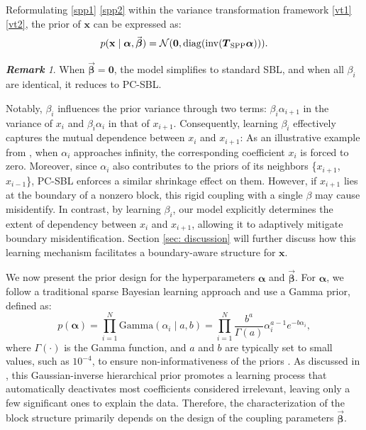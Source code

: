\documentclass[lettersize,journal]{IEEEtran}
\DeclareMathOperator{\inv}{inv}
\DeclareMathOperator{\diag}{diag}
\theoremstyle{remark}
\newtheorem{remark}{\textbf{Remark}}
\begin{document}
Reformulating \eqref{spp1} \eqref{spp2} within the variance transformation framework \eqref{vt1} \eqref{vt2}, the prior of \( \mathbf{x} \) can be expressed as:  
\begin{equation}
	p(\mathbf{x} \mid \boldsymbol{\alpha}, \vec{\boldsymbol{\beta}}) = \mathcal{N}(\mathbf{0},  \diag(\inv(\boldsymbol{T}_{\rm SPP}\boldsymbol{\alpha}))).\label{prior_x}
\end{equation}

\begin{remark}
	When $\vec{\boldsymbol{\beta}} = \mathbf{0}$, the model simplifies to standard SBL, and when all \( \beta_i \) are identical, it reduces to PC-SBL.
\end{remark}

\vspace{2mm}

 Notably, \( \beta_i \) influences the prior variance through two terms: \( \beta_i \alpha_{i+1} \) in the variance of \( x_i \) and \( \beta_i \alpha_i \) in that of \( x_{i+1} \). Consequently, learning \( \beta_i \) effectively captures the mutual dependence between \( x_i \) and \( x_{i+1} \): 
As an illustrative example from \cite{fang2014pattern}, when \( \alpha_i \) approaches infinity, the corresponding coefficient \( x_i \) is forced to zero. Moreover, since \( \alpha_i \) also contributes to the priors of its neighbors \{\( x_{i+1} \), \( x_{i-1} \)\},  PC-SBL enforces a similar shrinkage effect on them. However, if \( x_{i+1} \) lies at the boundary of a nonzero block, this rigid coupling with a single $\beta$ may cause misidentify. In contrast, by learning \( \beta_i \), our model explicitly determines the extent of dependency between \( x_i \) and \( x_{i+1} \), allowing it to adaptively mitigate boundary misidentification. {Section \ref{sec: discussion}} will further discuss how this learning mechanism facilitates a boundary-aware structure for \( \mathbf{x} \).

We now present the prior design for the hyperparameters \( \boldsymbol{\alpha} \) and $\vec{\boldsymbol{\beta}}$. For \( \boldsymbol{\alpha} \), we follow a traditional sparse Bayesian learning approach and use a Gamma prior, defined as:
\begin{equation}
	p(\boldsymbol{\alpha})=\prod_{i=1}^{N}\text{Gamma}\left(\alpha_i \mid a,b\right)= \prod_{i=1}^{N}\frac{b^a}{\Gamma(a)}\alpha_i^{a-1} e^{-b\alpha_i},\label{prior_alpha}
\end{equation}
 where \( \Gamma(\cdot) \) is the Gamma function, and \( a \) and \( b \) are typically set to small values, such as $10^{-4}$, to ensure non-informativeness of the priors \cite{tipping2001sparse}. 
As discussed in \cite{tipping2001sparse}, this Gaussian-inverse hierarchical prior promotes a learning process that automatically deactivates most coefficients considered irrelevant, leaving only a few significant ones to explain the data. Therefore, the characterization of the block structure primarily depends on the design of the coupling parameters $\vec{\boldsymbol{\beta}}$.
\end{document}
